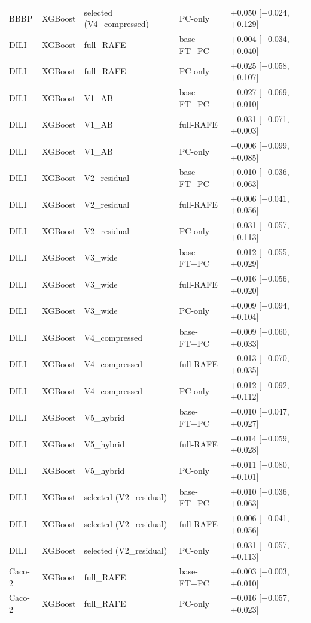 \begin{longtable}{lllp{2.6cm}p{4.2cm}}
BBBP & XGBoost & selected (V4\_compressed) & PC-only & +0.050 [$-$0.024, +0.129] \\
DILI & XGBoost & full\_RAFE & base-FT+PC & +0.004 [$-$0.034, +0.040] \\
DILI & XGBoost & full\_RAFE & PC-only & +0.025 [$-$0.058, +0.107] \\
DILI & XGBoost & V1\_AB & base-FT+PC & $-$0.027 [$-$0.069, +0.010] \\
DILI & XGBoost & V1\_AB & full-RAFE & $-$0.031 [$-$0.071, +0.003] \\
DILI & XGBoost & V1\_AB & PC-only & $-$0.006 [$-$0.099, +0.085] \\
DILI & XGBoost & V2\_residual & base-FT+PC & +0.010 [$-$0.036, +0.063] \\
DILI & XGBoost & V2\_residual & full-RAFE & +0.006 [$-$0.041, +0.056] \\
DILI & XGBoost & V2\_residual & PC-only & +0.031 [$-$0.057, +0.113] \\
DILI & XGBoost & V3\_wide & base-FT+PC & $-$0.012 [$-$0.055, +0.029] \\
DILI & XGBoost & V3\_wide & full-RAFE & $-$0.016 [$-$0.056, +0.020] \\
DILI & XGBoost & V3\_wide & PC-only & +0.009 [$-$0.094, +0.104] \\
DILI & XGBoost & V4\_compressed & base-FT+PC & $-$0.009 [$-$0.060, +0.033] \\
DILI & XGBoost & V4\_compressed & full-RAFE & $-$0.013 [$-$0.070, +0.035] \\
DILI & XGBoost & V4\_compressed & PC-only & +0.012 [$-$0.092, +0.112] \\
DILI & XGBoost & V5\_hybrid & base-FT+PC & $-$0.010 [$-$0.047, +0.027] \\
DILI & XGBoost & V5\_hybrid & full-RAFE & $-$0.014 [$-$0.059, +0.028] \\
DILI & XGBoost & V5\_hybrid & PC-only & +0.011 [$-$0.080, +0.101] \\
DILI & XGBoost & selected (V2\_residual) & base-FT+PC & +0.010 [$-$0.036, +0.063] \\
DILI & XGBoost & selected (V2\_residual) & full-RAFE & +0.006 [$-$0.041, +0.056] \\
DILI & XGBoost & selected (V2\_residual) & PC-only & +0.031 [$-$0.057, +0.113] \\
Caco-2 & XGBoost & full\_RAFE & base-FT+PC & +0.003 [$-$0.003, +0.010] \\
Caco-2 & XGBoost & full\_RAFE & PC-only & $-$0.016 [$-$0.057, +0.023] \\

\end{longtable}
